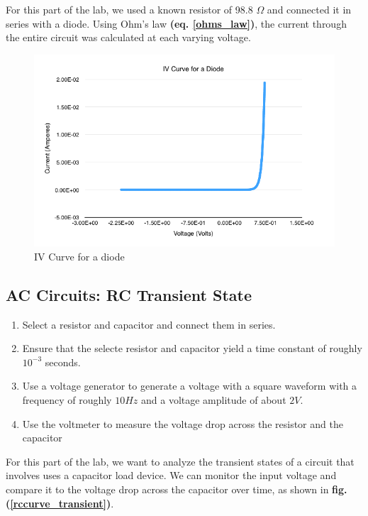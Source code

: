 \documentclass{article}
\begin{document}
For this part of the lab, we used a known resistor of 98.8 $\Omega$ and
connected it in series with a diode. Using Ohm's law \textbf{(eq.
\ref{ohms_law})}, the current through the entire circuit was calculated at each
varying voltage.

\begin{figure}[H]
    \centering
    \includegraphics[width=\textwidth]{charts/ivcurve_diode}
    \caption{IV Curve for a diode}
    \label{ivcurve_diode}
\end{figure}

\subsection{AC Circuits: RC Transient State}

\begin{enumerate}
    \item Select a resistor and capacitor and connect them in series.
    \item Ensure that the selecte resistor and capacitor yield a time constant
    of roughly $10^{-3}$ seconds.
    \item Use a voltage generator to generate a voltage with a square waveform
    with a frequency of roughly $10 Hz$ and a voltage amplitude of about $2 V$.
    \item Use the voltmeter to measure the voltage drop across the resistor and
    the capacitor
\end{enumerate}

For this part of the lab, we want to analyze the transient states of a circuit
that involves uses a capacitor load device. We can monitor the input voltage and
compare it to the voltage drop across the capacitor over time, as shown in
\textbf{fig. (\ref{rccurve_transient})}.
\end{document}

